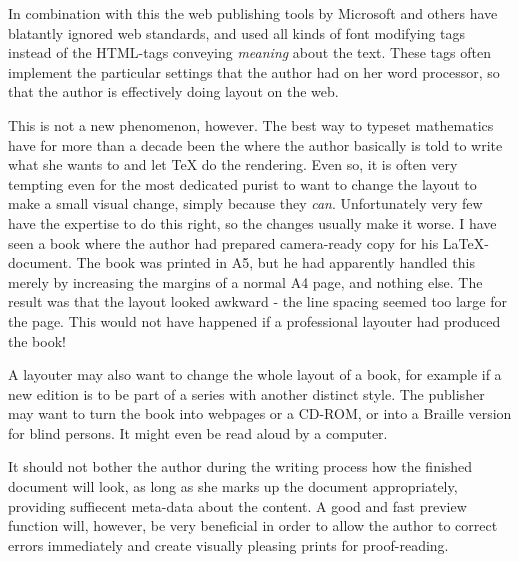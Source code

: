 In combination with this the web publishing tools by Microsoft and
others have blatantly ignored web standards, and used all kinds of
font modifying tags instead of the HTML-tags conveying \textit{meaning}
about the text.  These tags often implement the particular settings
that the author had on her word processor, so that the author is
effectively doing layout on the web.

This is not a new phenomenon, however.  The best way to typeset
mathematics have for more than a decade been the
 where the author basically is
told to write what she wants to and let {\TeX} do the rendering.  Even
so, it is often very tempting even for the most dedicated purist to
want to change the layout to make a small visual change, simply
because they \textit{can}.  Unfortunately very few have the expertise
to do this right, so the changes usually make it worse.  I have seen a
book where the author had prepared camera-ready copy for his
{\LaTeX}-document.  The book was printed in A5, but he had apparently
handled this merely by increasing the margins of a normal A4 page, and
nothing else.  The result was that the layout looked awkward - the
line spacing seemed too large for the page.  This would not have
happened if a professional layouter had produced the book!

A layouter may also want to change the whole layout of a book, for
example if a new edition is to be part of a series with another
distinct style.  The publisher may want to turn the book into webpages
or a CD-ROM, or into a Braille version for blind persons.  It might
even be read aloud by a computer.


It should not bother the author during the writing process how the
finished document will look, as long as she marks up the document
appropriately, providing suffiecent meta-data about the content.  A
good and fast preview function will, however, be very beneficial in
order to allow the author to correct errors immediately and create
visually pleasing prints for proof-reading.

